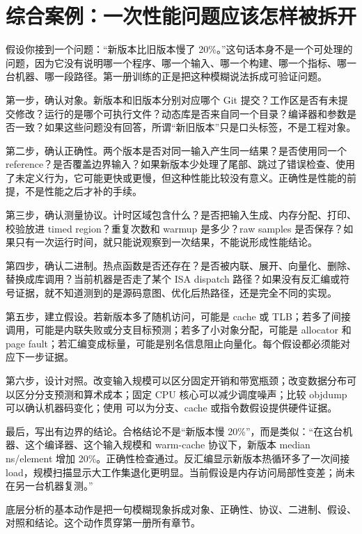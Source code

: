 \section{综合案例：一次性能问题应该怎样被拆开}

假设你接到一个问题：“新版本比旧版本慢了 20\%。”这句话本身不是一个可处理的问题，因为它没有说明哪一个程序、哪一个输入、哪一个构建、哪一个指标、哪一台机器、哪一段路径。第一册训练的正是把这种模糊说法拆成可验证问题。

第一步，确认对象。新版本和旧版本分别对应哪个 Git 提交？工作区是否有未提交修改？运行的是哪个可执行文件？动态库是否来自同一个目录？编译器和参数是否一致？如果这些问题没有回答，所谓“新旧版本”只是口头标签，不是工程对象。

第二步，确认正确性。两个版本是否对同一输入产生同一结果？是否使用同一个 reference？是否覆盖边界输入？如果新版本少处理了尾部、跳过了错误检查、使用了未定义行为，它可能更快或更慢，但这种性能比较没有意义。正确性是性能的前提，不是性能之后才补的手续。

第三步，确认测量协议。计时区域包含什么？是否把输入生成、内存分配、打印、校验放进 timed region？重复次数和 warmup 是多少？raw samples 是否保存？如果只有一次运行时间，就只能说观察到一次结果，不能说形成性能结论。

第四步，确认二进制。热点函数是否还存在？是否被内联、展开、向量化、删除、替换成库调用？当前机器是否走了某个 ISA dispatch 路径？如果没有反汇编或符号证据，就不知道测到的是源码意图、优化后热路径，还是完全不同的实现。

第五步，建立假设。若新版本多了随机访问，可能是 cache 或 TLB；若多了间接调用，可能是内联失败或分支目标预测；若多了小对象分配，可能是 allocator 和 page fault；若汇编变成标量，可能是别名信息阻止向量化。每个假设都必须能对应下一步证据。

第六步，设计对照。改变输入规模可以区分固定开销和带宽瓶颈；改变数据分布可以区分分支预测和算术成本；固定 CPU 核心可以减少调度噪声；比较 objdump 可以确认机器码变化；使用  可以为分支、cache 或指令数假设提供硬件证据。

最后，写出有边界的结论。合格结论不是“新版本慢 20\%”，而是类似：“在这台机器、这个编译器、这个输入规模和 warm-cache 协议下，新版本 median ns/element 增加 20\%。正确性检查通过。反汇编显示新版本热循环多了一次间接 load，规模扫描显示大工作集退化更明显。当前假设是内存访问局部性变差；尚未在另一台机器复测。”

\begin{keyidea}
底层分析的基本动作是把一句模糊现象拆成对象、正确性、协议、二进制、假设、对照和结论。这个动作贯穿第一册所有章节。
\end{keyidea}


